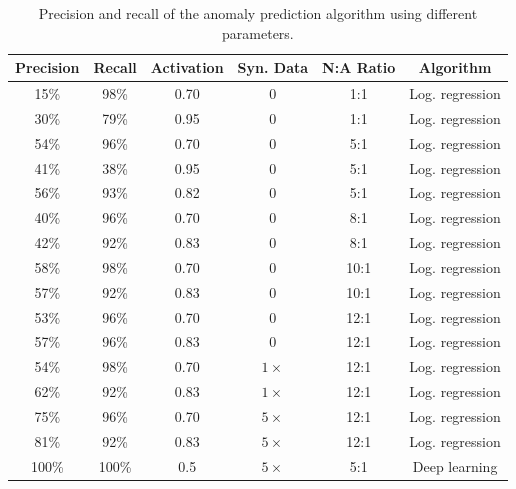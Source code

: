 \begin{table}[H]
    \centering
    \begin{tabular}{ c | c | c | c | c | c}
        Precision & Recall & Activation & Syn. Data & N:A Ratio & Algorithm\\
        \hline
        15\% & 98\% & 0.70 & 0 & 1:1 & Log. regression  \\
        30\% & 79\% & 0.95 & 0 & 1:1 & Log. regression  \\
        54\% & 96\% & 0.70 & 0 & 5:1 & Log. regression  \\
        41\% & 38\% & 0.95 & 0 & 5:1 & Log. regression  \\
        56\% & 93\% & 0.82 & 0 & 5:1 & Log. regression  \\
        40\% & 96\% & 0.70 & 0 & 8:1 & Log. regression  \\
        42\% & 92\% & 0.83 & 0 & 8:1 & Log. regression  \\
        58\% & 98\% & 0.70 & 0 & 10:1 & Log. regression  \\
        57\% & 92\% & 0.83 & 0 & 10:1 & Log. regression  \\
        53\% & 96\% & 0.70 & 0 & 12:1 & Log. regression  \\
        57\% & 96\% & 0.83 & 0 & 12:1 & Log. regression  \\
        54\% & 98\% & 0.70 & $1 \times$  & 12:1 & Log. regression  \\
        62\% & 92\% & 0.83 & $1 \times$ & 12:1 & Log. regression  \\
        75\% & 96\% & 0.70 & $5 \times$ & 12:1 & Log. regression  \\
        81\% & 92\% & 0.83 & $5 \times$ & 12:1 & Log. regression  \\
        100\% & 100\% & 0.5 & $5 \times$ & 5:1 & Deep learning  \\
    \end{tabular}
    \caption{Precision and recall of the anomaly prediction algorithm using different parameters.}
    \label{tab:03anomaly_pred_results}
\end{table}





















